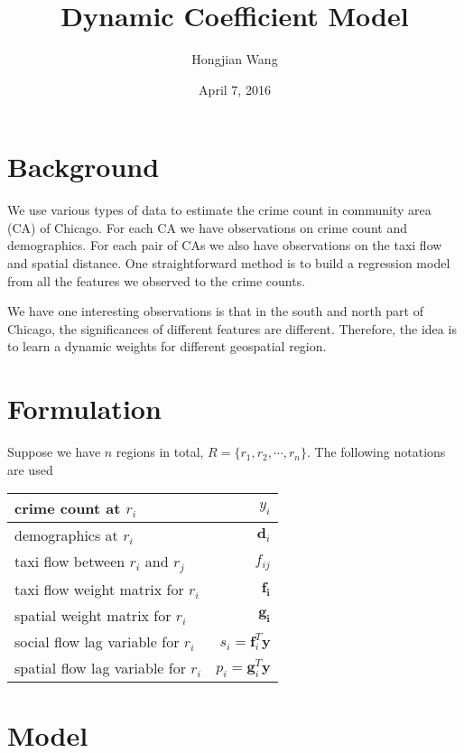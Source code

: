 \documentclass{article}
\title{Dynamic Coefficient Model}
\author{Hongjian Wang}
\date{April 7, 2016}
\begin{document}
\maketitle


\section{Background}


We use various types of data to estimate the crime count in community area (CA) of Chicago. For each CA we have observations on crime count and demographics. For each pair of CAs we also have observations on the taxi flow and spatial distance. One straightforward method is to build a regression model from all the features we observed to the crime counts.

We have one interesting observations is that in the south and north part of Chicago, the significances of different features are different. Therefore, the idea is to learn a dynamic weights for different geospatial region.



\section{Formulation}


Suppose we have $n$ regions in total, $R = \{ r_1, r_2, \cdots, r_n \}$.
The following notations are used

\begin{table}[h]
\centering
\begin{tabular}{|l|r|}
\hline
crime count at $r_i$ & $y_i$ \\ \hline
demographics at $r_i$ & $\mathbf{d}_i$ \\ \hline
taxi flow between $r_i$ and $r_j$ & $f_{ij}$ \\ \hline
taxi flow weight matrix for $r_i$ & $\mathbf{f_i}$ \\ \hline
spatial weight matrix for $r_i$ & $\mathbf{g_i}$ \\ \hline
social flow lag variable for $r_i$ & $s_i = \mathbf{f}_i^T \mathbf{y}$ \\\hline
spatial flow lag variable for $r_i$ & $p_i = \mathbf{g}_i^T \mathbf{y}$ \\\hline
\end{tabular}
\end{table}


\section{Model}
\end{document}
